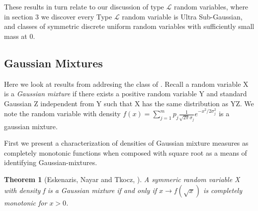 \documentclass[10pt]{article}
\newcommand{\1}{\textbf{1}}
\newtheorem{theorem}{Theorem}[subsection]
\newtheorem{lemma}{Lemma}[subsection]
\theoremstyle{remark}
\theoremstyle{definition}
\begin{document}

These results in turn relate to our discussion of type $\mathcal{L}$ random variables, where in section 3 we discover every Type $\mathcal{L}$ random variable is Ultra Sub-Gaussian, and classes of symmetric discrete uniform random variables with sufficiently small mass at 0.







\subsection{Gaussian Mixtures}

Here we look at results from \cite{ENT} addresing the class of . Recall a random variable X is a \textit{Gaussian mixture} if there exists a positive random variable Y and standard Gaussian Z independent from Y such that X has the same distribution as YZ. We note the random variable with density $f(x) = \sum_{j=1}^m p_j \frac{1}{\sqrt{2\pi}\sigma_j}e^{-x^2/2\sigma_j^2}$ is a gaussian mixture.

First we present a characterization of densities of Gaussian mixture measures as completely monotonic functions when composed with square root as a means of identifying Gaussian-mixtures.

\begin{theorem}[Eskenazis, Nayar and Tkocz, \cite{ENT}]\label{thm:ENT2}
	A symmeric random variable X with density f is a Gaussian mixture if and only if $x \to f(\sqrt{x})$ is completely monotonic for $x > 0$. 
\end{theorem}
\end{document}
